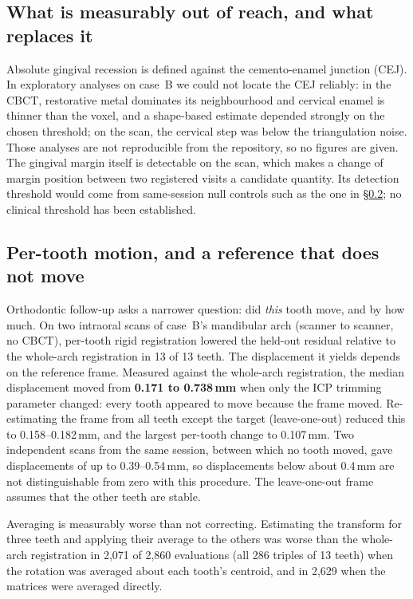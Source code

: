 \documentclass[11pt,a4paper]{article}
\begin{document}
\subsection{What is measurably out of reach, and what replaces it}\label{sec:cej}

Absolute gingival recession is defined against the cemento-enamel junction (CEJ). In
exploratory analyses on case~B we could not locate the CEJ reliably: in the CBCT, restorative
metal dominates its neighbourhood and cervical enamel is thinner than the voxel, and a
shape-based estimate depended strongly on the chosen threshold; on the scan, the cervical step
was below the triangulation noise. Those analyses are not reproducible from the repository,
so no figures are given. The gingival margin itself is detectable on the scan, which makes a
change of margin position between two registered visits a candidate quantity. Its detection
threshold would come from same-session null controls such as the one in
\S\ref{sec:pertooth}; no clinical threshold has been established.

\subsection{Per-tooth motion, and a reference that does not move}\label{sec:pertooth}

Orthodontic follow-up asks a narrower question: did \emph{this} tooth move, and by how much.
On two intraoral scans of case~B's mandibular arch (scanner to scanner, no CBCT), per-tooth
rigid registration lowered the held-out residual relative to the whole-arch registration in
13 of 13 teeth. The displacement it yields depends on the reference frame. Measured against
the whole-arch registration, the median displacement moved from \textbf{0.171 to
0.738\,mm} when only the ICP trimming parameter changed: every tooth appeared to move
because the frame moved. Re-estimating the frame from all teeth except the target
(leave-one-out) reduced this to 0.158--0.182\,mm, and the largest per-tooth change to
0.107\,mm. Two independent scans from the same session, between which no tooth moved, gave
displacements of up to 0.39--0.54\,mm, so displacements below about 0.4\,mm are not
distinguishable from zero with this procedure. The leave-one-out frame assumes that the other
teeth are stable.

Averaging is measurably worse than not correcting. Estimating the transform for three teeth
and applying their average to the others was worse than the whole-arch registration in
2{,}071 of 2{,}860 evaluations (all 286 triples of 13 teeth) when the rotation was averaged
about each tooth's centroid, and in 2{,}629 when the matrices were averaged directly.
\end{document}
